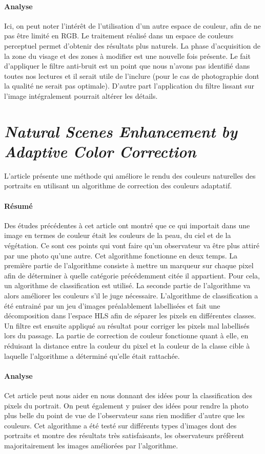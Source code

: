 \documentclass[11pt, french]{report-rd-info}
\begin{document}
\paragraph{Analyse}
Ici, on peut noter l'intérêt de l'utilisation d'un autre espace de couleur, afin de ne pas être limité en RGB. Le traitement réalisé dans un espace de couleurs perceptuel permet d'obtenir des résultats plus naturels. La phase d'acquisition de la zone du visage et des zones à modifier est une nouvelle fois présente.
Le fait d’appliquer le filtre anti-bruit est un point que nous n’avons pas identifié dans toutes nos lectures et il serait utile de l’inclure (pour le cas de photographie dont la qualité ne serait pas optimale). D’autre part l’application du filtre lissant sur l’image intégralement pourrait altérer les détails.
\section{\emph{Natural Scenes Enhancement by Adaptive Color Correction}}
L'article \cite{Naccari} présente une méthode qui améliore le rendu des couleurs naturelles des portraits en utilisant un algorithme de correction des couleurs adaptatif.
\paragraph{Résumé}
Des études précédentes à cet article ont montré que ce qui importait dans une image en termes de couleur était les couleurs de la peau, du ciel et de la végétation. Ce sont ces points qui vont faire qu'un observateur va être plus attiré par une photo qu'une autre. Cet algorithme fonctionne en deux temps. La première partie de l'algorithme consiste à mettre un marqueur sur chaque pixel afin de déterminer à quelle catégorie précédemment citée il appartient. Pour cela, un algorithme de classification est utilisé. La seconde partie de l'algorithme va alors améliorer les couleurs s'il le juge nécessaire.
L'algorithme de classification a été entrainé par un jeu d'images préalablement labellisées et fait une décomposition dans l'espace HLS afin de séparer les pixels en différentes classes. Un filtre est ensuite appliqué au résultat pour corriger les pixels mal labellisés lors du passage.
La partie de correction de couleur fonctionne quant à elle, en réduisant la distance entre la couleur du pixel et la couleur de la classe cible à laquelle l'algorithme a déterminé qu'elle était rattachée.
\paragraph{Analyse}
Cet article peut nous aider en nous donnant des idées pour la classification des pixels du portrait.
On peut également y puiser des idées pour rendre la photo plus belle du point de vue de l'observateur sans rien modifier d'autre que les couleurs.
Cet algorithme a été testé sur différents types d'images dont des portraits et montre des résultats très satisfaisants, les observateurs préfèrent majoritairement les images améliorées par l'algorithme.
\end{document}
